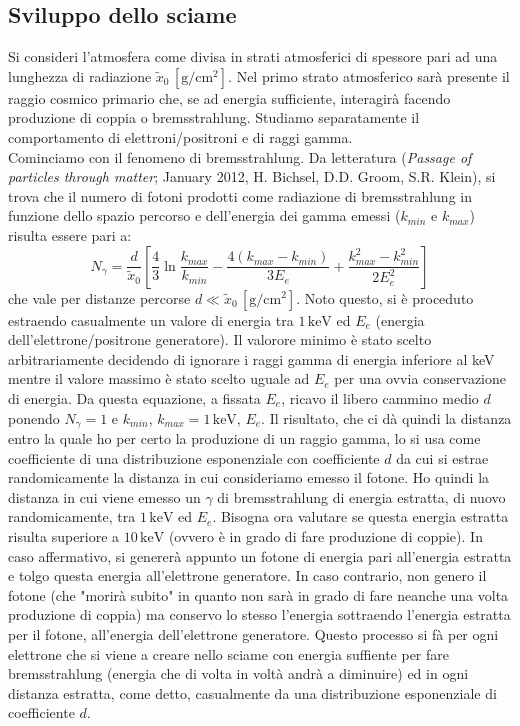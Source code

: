 \documentclass[10pt,a4paper,usenatbib]{article}
\newcommand*{\unit}[1]{\ensuremath{\mathrm{\,#1}}}                              %
\begin{document}
\subsection{Sviluppo dello sciame}
Si consideri l'atmosfera come divisa in strati atmosferici di spessore pari ad una lunghezza di radiazione $\tilde{x}_0 \unit{[g/cm^2]}$. Nel primo strato atmosferico sarà presente il raggio cosmico primario che, se ad energia sufficiente, interagirà facendo produzione di coppia o bremsstrahlung. Studiamo separatamente il comportamento di elettroni/positroni e di raggi gamma. 
\\Cominciamo con il fenomeno di bremsstrahlung. Da letteratura (\textit{Passage of particles through matter}; January 2012, H. Bichsel, D.D. Groom, S.R. Klein), si trova che il numero di fotoni prodotti come radiazione di bremsstrahlung in funzione dello spazio percorso e dell'energia dei gamma emessi ($k_{min}$ e $k_{max}$) risulta essere pari a: 
\begin{equation}
N_\gamma = \frac{d}{\tilde{x}_0}\left[\frac{4}{3}\ln{\frac{k_{max}}{k_{min}}}-\frac{4(k_{max} - k_{min})}{3E_e}+\frac{k_{max}^2 - k_{min}^2}{2E_e^2}\right]
\end{equation}
che vale per distanze percorse $d \ll \tilde{x}_0 \unit{[g/cm^2]}$. Noto questo, si è proceduto estraendo casualmente un valore di energia tra $1 \unit{keV}$ ed $E_e$ (energia dell'elettrone/positrone generatore). Il valorore minimo è stato scelto arbitrariamente decidendo di ignorare i raggi gamma di energia inferiore al keV mentre il valore massimo è stato scelto uguale ad $E_e$ per una ovvia conservazione di energia. Da questa equazione, a fissata $E_e$, ricavo il libero cammino medio $d$ ponendo $N_\gamma = 1$ e $k_{min}$, $k_{max} = 1 \unit{keV}$, $E_e$. Il risultato, che ci dà quindi la distanza entro la quale ho per certo la produzione di un raggio gamma, lo si usa come coefficiente di una distribuzione esponenziale con coefficiente $d$ da cui si estrae randomicamente la distanza in cui consideriamo emesso il fotone. Ho quindi la distanza in cui viene emesso un $\gamma$ di bremsstrahlung di energia estratta, di nuovo randomicamente, tra $1\unit{keV}$ ed $E_e$. Bisogna ora valutare se questa energia estratta risulta superiore a $10\unit{keV}$ (ovvero è in grado di fare produzione di coppie). In caso affermativo, si genererà appunto un fotone di energia pari all'energia estratta e tolgo questa energia all'elettrone generatore. In caso contrario, non genero il fotone (che "morirà subito" in quanto non sarà in grado di fare neanche una volta produzione di coppia) ma conservo lo stesso l'energia sottraendo l'energia estratta per il fotone, all'energia dell'elettrone generatore. Questo processo si fà per ogni elettrone che si viene a creare nello sciame con energia suffiente per fare bremsstrahlung (energia che di volta in voltà andrà a diminuire) ed in ogni distanza estratta, come detto, casualmente da una distribuzione esponenziale di coefficiente $d$. 
\end{document}
